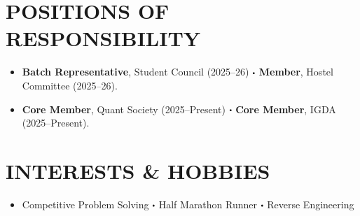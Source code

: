 \documentclass[letterpaper,11pt]{article}
\newcommand{\resumeItem}[1]{
  \item\small{
    {#1 \vspace{-2pt}}
  }
}
\newcommand{\resumeItemListStart}{\begin{itemize}[itemsep=1pt, topsep=2pt, parsep=0pt, partopsep=0pt]}
\newcommand{\resumeItemListEnd}{\end{itemize}\vspace{-5pt}}
\newcommand\sbullet[1][.5]{\mathbin{\vcenter{\hbox{\scalebox{#1}{$\bullet$}}}}}
\begin{document}
\section{POSITIONS OF RESPONSIBILITY}
\vspace{-5pt}
\resumeItemListStart
\resumeItem{\normalsize{\textbf{Batch Representative}, Student Council (2025--26) \quad $\sbullet$ \quad \textbf{Member}, Hostel Committee (2025--26).}}
\resumeItem{\normalsize{\textbf{Core Member}, Quant Society (2025--Present) \quad $\sbullet$ \quad \textbf{Core Member}, IGDA (2025--Present).}}
\resumeItemListEnd
\vspace{-3pt}


\section{INTERESTS \& HOBBIES}
\vspace{-5pt}
\resumeItemListStart
\resumeItem{\normalsize{Competitive Problem Solving \quad $\sbullet$ \quad Half Marathon Runner \quad $\sbullet$ \quad Reverse Engineering}}
\resumeItemListEnd
\end{document}
